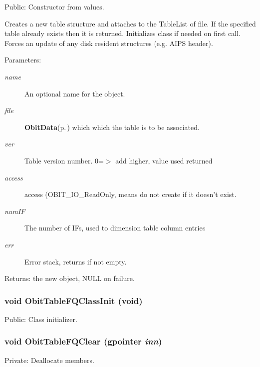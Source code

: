 Public: Constructor from values. 

Creates a new table structure and attaches to the Table\-List of file. If the specified table already exists then it is returned. Initializes class if needed on first call. Forces an update of any disk resident structures (e.g. AIPS header). \begin{Desc}
\item[Parameters:]
\begin{description}
\item[{\em name}]An optional name for the object. \item[{\em file}]{\bf Obit\-Data}{\rm (p.\,\pageref{structObitData})} which which the table is to be associated. \item[{\em ver}]Table version number. 0=$>$ add higher, value used returned \item[{\em access}]access (OBIT\_\-IO\_\-Read\-Only, means do not create if it doesn't exist. \item[{\em num\-IF}]The number of IFs, used to dimension table column entries \item[{\em err}]Error stack, returns if not empty. \end{description}
\end{Desc}
\begin{Desc}
\item[Returns:]the new object, NULL on failure. \end{Desc}
\subsubsection{\setlength{\rightskip}{0pt plus 5cm}void Obit\-Table\-FQClass\-Init (void)}\label{ObitTableFQ_8c_a27}


Public: Class initializer. 

\subsubsection{\setlength{\rightskip}{0pt plus 5cm}void Obit\-Table\-FQClear (gpointer {\em inn})}\label{ObitTableFQ_8c_a9}


Private: Deallocate members. 

